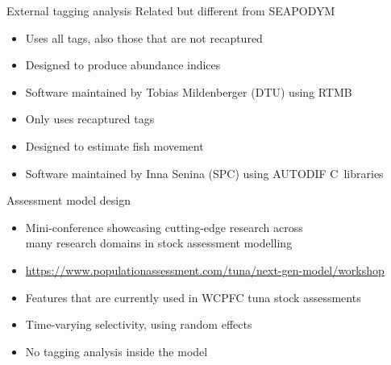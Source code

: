 \documentclass[aspectratio=169]{beamer}
\newcommand\cpp{\mbox{C\raisebox{0.5ex}{\tiny\bfseries ++}}}
\begin{document}
\begin{frame}{External tagging analysis}\small
  Related but different from SEAPODYM\\[4ex]
  \begin{itemize}
    \item[] Uses all tags, also those that are not recaptured\\[-0.6ex]
    \item[] Designed to produce abundance indices\\[-0.6ex]
    \item[] Software maintained by Tobias Mildenberger (DTU) using RTMB\\[4ex]
  \end{itemize}
  \begin{itemize}
    \item[] Only uses recaptured tags\\[-0.6ex]
    \item[] Designed to estimate fish movement\\[-0.6ex]
    \item[] Software maintained by Inna Senina (SPC) using AUTODIF \cpp\
    libraries
  \end{itemize}
\end{frame}


\begin{frame}{Assessment model design}\small
  \begin{itemize}
    \item[] Mini-conference showcasing cutting-edge research across\\[0.2ex]
    many research domains in stock assessment modelling\\[2ex]
    \item[] \blue\fns
    \url{https://www.populationassessment.com/tuna/next-gen-model/workshop}
  \end{itemize}
  \vspace{4ex}
  \begin{itemize}
    \item Features that are currently used in WCPFC tuna stock
    assessments\\[1.2ex]
    \item[+] Time-varying selectivity, using random effects\\[1.2ex]
    \item[--\,] No tagging analysis inside the model
  \end{itemize}
\end{frame}
\end{document}

